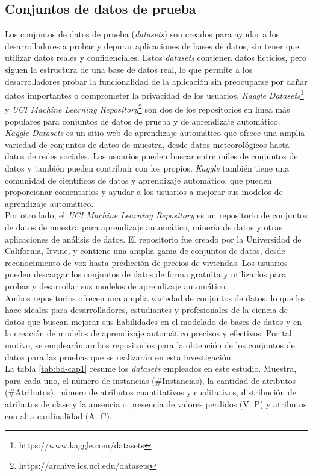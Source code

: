 \subsection{Conjuntos de datos de prueba}
Los conjuntos de datos de prueba (\textit{datasets}) son creados para ayudar a los desarrolladores a probar y depurar aplicaciones de bases de datos, sin tener que utilizar datos reales y confidenciales. Estos \textit{datasets} contienen datos ficticios, pero siguen la estructura de una base de datos real, lo que permite a los desarrolladores probar la funcionalidad de la aplicación sin preocuparse por dañar datos importantes o comprometer la privacidad de los usuarios. \textit{Kaggle Datasets}\footnote{https://www.kaggle.com/datasets} y \textit{UCI Machine Learning Repository}\footnote{https://archive.ics.uci.edu/datasets} son dos de los repositorios en línea más populares para conjuntos de datos de prueba y de aprendizaje automático. \\
\textit{Kaggle Datasets} es un sitio web de aprendizaje automático que ofrece una amplia variedad de conjuntos de datos de muestra, desde datos meteorológicos hasta datos de redes sociales. Los usuarios pueden buscar entre miles de conjuntos de datos y también pueden contribuir con los propios. \textit{Kaggle} también tiene una comunidad de científicos de datos y aprendizaje automático, que pueden proporcionar comentarios y ayudar a los usuarios a mejorar sus modelos de aprendizaje automático. \\
Por otro lado, el \textit{UCI Machine Learning Repository} es un repositorio de conjuntos de datos de muestra para aprendizaje automático, minería de datos y otras aplicaciones de análisis de datos. El repositorio fue creado por la Universidad de California, Irvine, y contiene una amplia gama de conjuntos de datos, desde reconocimiento de voz hasta predicción de precios de viviendas. Los usuarios pueden descargar los conjuntos de datos de forma gratuita y utilizarlos para probar y desarrollar sus modelos de aprendizaje automático. \\
Ambos repositorios ofrecen una amplia variedad de conjuntos de datos, lo que los hace ideales para desarrolladores, estudiantes y profesionales de la ciencia de datos que buscan mejorar sus habilidades en el modelado de bases de datos y en la creación de modelos de aprendizaje automático precisos y efectivos. Por tal motivo, se emplearán ambos repositorios para la obtención de los conjuntos de datos para las pruebas que se realizarán en esta investigación. \\
La tabla \ref{tab:bd-cap1} resume los \textit{datasets} empleados en este estudio. Muestra, para cada uno, el número de instancias (\#Instancias), la cantidad de atributos (\#Atributos), número de atributos cuantitativos y cualitativos, distribución de atributos de clase y la ausencia o presencia de valores perdidos (V. P) y atributos con alta cardinalidad (A. C).

